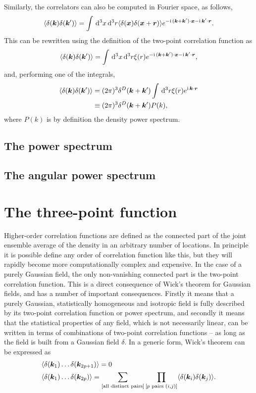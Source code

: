 Similarly, the correlators can also be computed in Fourier space, as follows, 
\begin{equation}
	\langle \delta(\bm {k}) \delta(\bm {k}') \rangle = \int \,\mathrm{d}^3 x \,\mathrm{d}^3 r \langle \delta(\bm {x}) \delta(\bm {x} + \bm{r})\rangle e^{-\mathrm{i\,} (\bm {k} + \bm {k}') \cdot \bm {x} - \mathrm{i\,} \bm {k}' \cdot \bm{r}}.
\end{equation}
This can be rewritten using the definition of the two-point correlation function as 
\begin{equation}
	\langle \delta(\bm {k}) \delta(\bm {k}') \rangle = \int \,\mathrm{d}^3 x \,\mathrm{d}^3 r \xi(r) e^{-\mathrm{i\,} (\bm {k} + \bm {k}') \cdot \bm {x} - \mathrm{i\,} \bm {k}' \cdot \bm{r}},
\end{equation}
and, performing one of the integrals, 
\begin{align}
	\langle \delta(\bm {k}) \delta(\bm {k}') \rangle &= (2\pi)^3 \delta^D(\bm {k} + \bm {k}') \int \,\mathrm{d}^3 r \xi(r) e^{\mathrm{i\,} \bm {k} \cdot \bm{r}} \\
	&\equiv (2\pi)^3 \delta^D(\bm {k} + \bm {k}') P(k),
\end{align}
where $P(k)$ is by definition the density power spectrum.

\subsection{The power spectrum}

\subsection{The angular power spectrum}

\section{The three-point function}

Higher-order correlation functions are defined as the connected part of the joint ensemble average of the density in an arbitrary number of locations. In principle it is possible define any order of correlation function like this, but they will rapidly become more computationally complex and expensive. In the case of a purely Gaussian field, the only non-vanishing connected part is the two-point correlation function. This is a direct consequence of Wick's theorem for Gaussian fields, and has a number of important consequences. Firstly it means that a purely Gaussian, statistically homogeneous and isotropic field is fully described by its two-point correlation function or power spectrum, and secondly it means that the statistical properties of any field, which is not necessarily linear, can be written in terms of combinations of two-point correlation functions -- as long as the field is built from a Gaussian field $\delta$. In a generic form, Wick's theorem can be expressed as 
\begin{align}
	&\langle \delta(\bm {k}_1) \ldots \delta(\bm{k}_{2p + 1}) \rangle = 0 \nonumber \\
	&\langle \delta(\bm {k}_1) \ldots \delta(\bm{k}_{2p})\rangle = \sum_{[\text{all distinct pairs}]} \prod_{[p \text{ pairs } (i,j)]} \langle \delta(\bm{k}_i) \delta(\bm{k}_j) \rangle.  
\end{align}


